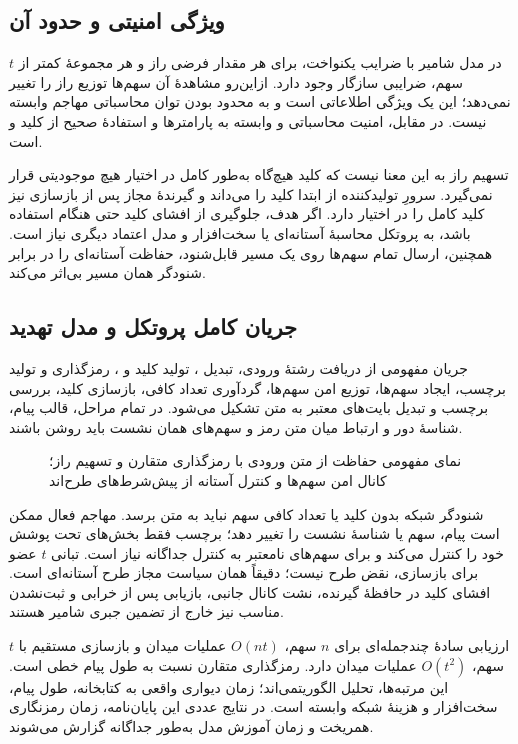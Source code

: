 \subsection{ویژگی امنیتی و حدود آن}
در مدل شامیر با ضرایب یکنواخت، برای هر مقدار فرضی راز و هر مجموعۀ کمتر از $t$ سهم، ضرایبی سازگار وجود دارد. ازاین‌رو مشاهدۀ آن سهم‌ها توزیع راز را تغییر نمی‌دهد؛ این یک ویژگی اطلاعاتی است و به محدود بودن توان محاسباتی مهاجم وابسته نیست. در مقابل، امنیت  محاسباتی و وابسته به پارامترها و استفادۀ صحیح از کلید و  است.

تسهیم راز به این معنا نیست که کلید هیچ‌گاه به‌طور کامل در اختیار هیچ موجودیتی قرار نمی‌گیرد. سرورِ تولیدکننده از ابتدا کلید را می‌داند و گیرندۀ مجاز پس از بازسازی نیز کلید کامل را در اختیار دارد. اگر هدف، جلوگیری از افشای کلید حتی هنگام استفاده باشد، به پروتکل محاسبۀ آستانه‌ای یا سخت‌افزار و مدل اعتماد دیگری نیاز است. همچنین، ارسال تمام سهم‌ها روی یک مسیر قابل‌شنود، حفاظت آستانه‌ای را در برابر شنودگر همان مسیر بی‌اثر می‌کند.

\subsection{جریان کامل پروتکل و مدل تهدید}
جریان مفهومی از دریافت رشتۀ ورودی، تبدیل ، تولید کلید و ، رمزگذاری و تولید برچسب، ایجاد سهم‌ها، توزیع امن سهم‌ها، گردآوری تعداد کافی، بازسازی کلید، بررسی برچسب و تبدیل بایت‌های معتبر به متن تشکیل می‌شود. در تمام مراحل، قالب پیام، شناسۀ دور و ارتباط میان متن رمز و سهم‌های همان نشست باید روشن باشند.

\begin{figure}[htbp]
\centering
\caption{نمای مفهومی حفاظت از متن ورودی با رمزگذاری متقارن و تسهیم راز؛ کانال امن سهم‌ها و کنترل آستانه از پیش‌شرط‌های طرح‌اند}
\label{fig:aes-shamir}
\end{figure}

شنودگر شبکه بدون کلید یا تعداد کافی سهم نباید به متن برسد. مهاجم فعال ممکن است پیام، سهم یا شناسۀ نشست را تغییر دهد؛ برچسب  فقط بخش‌های تحت پوشش خود را کنترل می‌کند و برای سهم‌های نامعتبر به کنترل جداگانه نیاز است. تبانی $t$ عضو برای بازسازی، نقض طرح نیست؛ دقیقاً همان سیاست مجاز طرح آستانه‌ای است. افشای کلید در حافظۀ گیرنده، نشت کانال جانبی، بازیابی پس از خرابی و ثبت‌نشدن مناسب  نیز خارج از تضمین جبری شامیر هستند.

ارزیابی سادۀ چندجمله‌ای برای $n$ سهم، $O(nt)$ عملیات میدان و بازسازی مستقیم با $t$ سهم، $O(t^2)$ عملیات میدان دارد. رمزگذاری متقارن نسبت به طول پیام خطی است. این مرتبه‌ها، تحلیل الگوریتمی‌اند؛ زمان دیواری واقعی به کتابخانه، طول پیام، سخت‌افزار و هزینۀ شبکه وابسته است. در نتایج عددی این پایان‌نامه، زمان رمزنگاری همریخت و زمان آموزش مدل به‌طور جداگانه گزارش می‌شوند.

